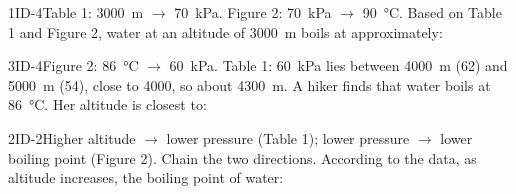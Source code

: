 \documentclass[11pt]{article}
\begin{document}
\begin{minipage}[c]{0.40\linewidth}
\end{minipage}\hfill
\begin{minipage}[c]{0.57\linewidth}
\centering
{}
\end{minipage}
\passageend

\begin{q}{1}{ID-4}{Table 1: \SI{3000}{\metre} $\to$ \SI{70}{\kilo\pascal}. Figure 2: \SI{70}{\kilo\pascal} $\to$ \SI{90}{\celsius}.}
Based on Table 1 and Figure 2, water at an altitude of \SI{3000}{\metre} boils at approximately:
\end{q}

\begin{q}{3}{ID-4}{Figure 2: \SI{86}{\celsius} $\to$ \SI{60}{\kilo\pascal}. Table 1: \SI{60}{\kilo\pascal} lies between \SI{4000}{\metre} (62) and \SI{5000}{\metre} (54), close to 4000, so about \SI{4300}{\metre}.}
A hiker finds that water boils at \SI{86}{\celsius}. Her altitude is closest to:
\end{q}

\begin{q}{2}{ID-2}{Higher altitude $\to$ lower pressure (Table 1); lower pressure $\to$ lower boiling point (Figure 2). Chain the two directions.}
According to the data, as altitude increases, the boiling point of water:
\end{q}
\end{document}
